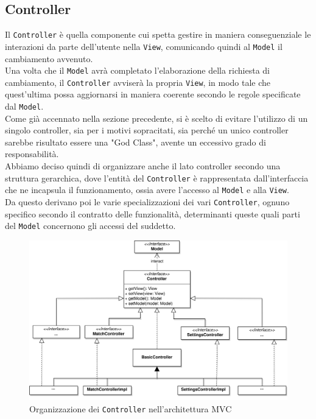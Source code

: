 \documentclass[a4paper,12pt]{report}
\begin{document}
\subsection{Controller}
Il \texttt{Controller} è quella componente cui spetta gestire in maniera conseguenziale le interazioni da parte dell'utente nella \texttt{View}, comunicando quindi al \texttt{Model} il cambiamento avvenuto.
\\
Una volta che il \texttt{Model} avrà completato l'elaborazione della richiesta di cambiamento, il \texttt{Controller} avviserà la propria \texttt{View}, in modo tale che quest'ultima possa aggiornarsi in maniera coerente secondo le regole specificate dal \texttt{Model}.
\\
Come già accennato nella sezione precedente, si è scelto di evitare l'utilizzo di un singolo controller, sia per i motivi sopracitati, sia perché un unico controller sarebbe risultato essere una "God Class", avente un eccessivo grado di responsabilità.
\\
Abbiamo deciso quindi di organizzare anche il lato controller secondo una struttura gerarchica, dove l'entità del \texttt{Controller} è rappresentata dall'interfaccia che ne incapsula il funzionamento, ossia avere l'accesso al \texttt{Model} e alla \texttt{View}.
\\
Da questo derivano poi le varie specializzazioni dei vari \texttt{Controller}, ognuno specifico secondo il contratto delle funzionalità, determinanti queste quali parti del \texttt{Model} concernono gli accessi del suddetto.
\begin{figure}[H]
    \begin{center}
        \centering
        \includegraphics[width=\textwidth]{img/MVC/controller.png}
    \end{center}
    \caption{Organizzazione dei \texttt{Controller} nell'architettura MVC}
    \label{img:analysis5}
\end{figure}
\end{document}
